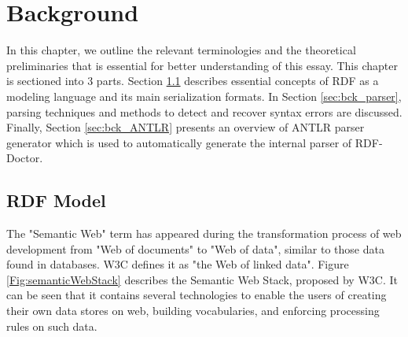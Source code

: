 \chapter{Background}
\label{ch:preliminaries}

In this chapter, we outline the relevant terminologies and the theoretical  preliminaries that is essential for better understanding of this essay.
This chapter is sectioned into 3 parts.
Section \ref{sec:bck_rdf_model} describes essential concepts of RDF as a modeling language and its main serialization formats. 
In Section \ref{sec:bck_parser}, parsing techniques and methods to detect and recover syntax errors are discussed. Finally, Section \ref{sec:bck_ANTLR} presents an overview of ANTLR parser generator which is used to automatically generate the internal parser of RDF-Doctor.


\section{RDF Model}
\label{sec:bck_rdf_model}

The "Semantic Web" \cite{W3C:SemanticWebTerm:Online} term  has appeared during the transformation process of web development from "Web of documents" to "Web of data", similar to those data found in databases. 
W3C defines it as "the Web of linked data". {Figure \ref{Fig:semanticWebStack}} describes the Semantic Web Stack, proposed by W3C. It can be seen that it contains several technologies to enable the users of creating their own data stores on web, building vocabularies, and enforcing processing rules on such data.   

